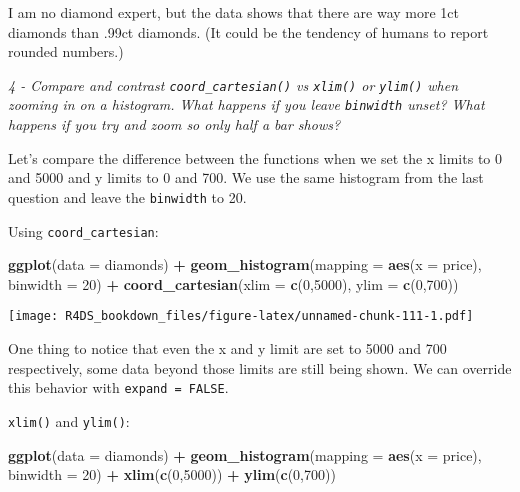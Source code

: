 \documentclass[]{article}
\newenvironment{Shaded}{\begin{snugshade}}{\end{snugshade}}
\newcommand{\KeywordTok}[1]{\textcolor[rgb]{0.13,0.29,0.53}{\textbf{#1}}}
\newcommand{\DataTypeTok}[1]{\textcolor[rgb]{0.13,0.29,0.53}{#1}}
\newcommand{\DecValTok}[1]{\textcolor[rgb]{0.00,0.00,0.81}{#1}}
\newcommand{\StringTok}[1]{\textcolor[rgb]{0.31,0.60,0.02}{#1}}
\newcommand{\OperatorTok}[1]{\textcolor[rgb]{0.81,0.36,0.00}{\textbf{#1}}}
\newcommand{\NormalTok}[1]{#1}
\theoremstyle{definition}
\theoremstyle{definition}
\theoremstyle{definition}
\theoremstyle{remark}
\begin{document}
I am no diamond expert, but the data shows that there are way more 1ct
diamonds than .99ct diamonds. (It could be the tendency of humans to
report rounded numbers.)

\emph{4 - Compare and contrast \texttt{coord\_cartesian()} vs
\texttt{xlim()} or \texttt{ylim()} when zooming in on a histogram. What
happens if you leave \texttt{binwidth} unset? What happens if you try
and zoom so only half a bar shows?}

Let's compare the difference between the functions when we set the x
limits to 0 and 5000 and y limits to 0 and 700. We use the same
histogram from the last question and leave the \texttt{binwidth} to 20.

Using \texttt{coord\_cartesian}:

\begin{Shaded}
\begin{Highlighting}[]
\KeywordTok{ggplot}\NormalTok{(}\DataTypeTok{data =}\NormalTok{ diamonds) }\OperatorTok{+}
\StringTok{  }\KeywordTok{geom_histogram}\NormalTok{(}\DataTypeTok{mapping =} \KeywordTok{aes}\NormalTok{(}\DataTypeTok{x =}\NormalTok{ price), }\DataTypeTok{binwidth =} \DecValTok{20}\NormalTok{) }\OperatorTok{+}
\StringTok{  }\KeywordTok{coord_cartesian}\NormalTok{(}\DataTypeTok{xlim =} \KeywordTok{c}\NormalTok{(}\DecValTok{0}\NormalTok{,}\DecValTok{5000}\NormalTok{), }\DataTypeTok{ylim =} \KeywordTok{c}\NormalTok{(}\DecValTok{0}\NormalTok{,}\DecValTok{700}\NormalTok{))}
\end{Highlighting}
\end{Shaded}

\texttt{[image: R4DS\_bookdown\_files/figure-latex/unnamed-chunk-111-1.pdf]}

One thing to notice that even the x and y limit are set to 5000 and 700
respectively, some data beyond those limits are still being shown. We
can override this behavior with \texttt{expand\ =\ FALSE}.

\texttt{xlim()} and \texttt{ylim()}:

\begin{Shaded}
\begin{Highlighting}[]
\KeywordTok{ggplot}\NormalTok{(}\DataTypeTok{data =}\NormalTok{ diamonds) }\OperatorTok{+}
\StringTok{  }\KeywordTok{geom_histogram}\NormalTok{(}\DataTypeTok{mapping =} \KeywordTok{aes}\NormalTok{(}\DataTypeTok{x =}\NormalTok{ price), }\DataTypeTok{binwidth =} \DecValTok{20}\NormalTok{) }\OperatorTok{+}
\StringTok{  }\KeywordTok{xlim}\NormalTok{(}\KeywordTok{c}\NormalTok{(}\DecValTok{0}\NormalTok{,}\DecValTok{5000}\NormalTok{)) }\OperatorTok{+}
\StringTok{  }\KeywordTok{ylim}\NormalTok{(}\KeywordTok{c}\NormalTok{(}\DecValTok{0}\NormalTok{,}\DecValTok{700}\NormalTok{))}
\end{Highlighting}
\end{Shaded}
\end{document}
